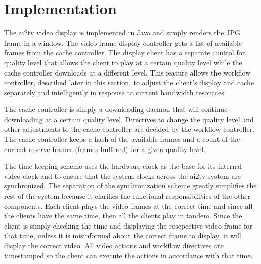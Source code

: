 \documentclass{sig-alternate}
\begin{document}
% 

\section{Implementation} \label{implementation}

The ai2tv video display is implemented in Java and simply
renders the JPG frame in a window.  The video frame display controller
gets a list of available frames from the cache controller.  The
display client has a separate control for quality level that allows
the client to play at a certain quality level while the cache
controller downloads at a different level.  This feature allows the
workflow controller, described later in this section, to adjust the
client's display and cache separately and intelligently in response to
current bandwidth resources.

The cache controller is simply a downloading daemon that will continue
downloading at a certain quality level.  Directives to change the
quality level and other adjustments to the cache controller are
decided by the workflow controller.  The cache controller keeps a hash
of the available frames and a count of the current reserve frames
(frames buffered) for a given quality level.

The time keeping scheme uses the hardware clock as the base for its
internal video clock and  to ensure that the system clocks across
the ai2tv system are synchronized.  The separation of the
synchronization scheme greatly simplifies the rest of the system
because it clarifies the functional responsibilities of the other
components.  Each client plays the video frames at the correct time
and since all the clients have the same time, then all the clients
play in tandem.  Since the client is simply checking the time and
displaying the resepective video frame for that time, unless it is
misinformed about the correct frame to display, it will display the
correct video.  All video actions and workflow directives are
timestamped so the client can execute the actions in accordance with
that time.
\end{document}
